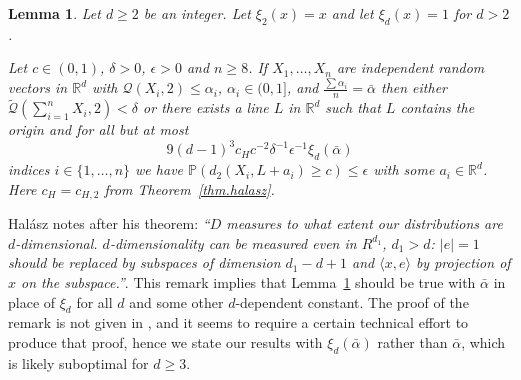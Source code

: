 \documentclass{article}
\newtheorem{lemma} [theorem] {Lemma}\newtheorem{attempt} [theorem] {Attempt}\newtheorem{corollary} [theorem] {Corollary}\newtheorem{prop} [theorem] {Proposition}\newtheorem{definition} [theorem] {Definition}\newtheorem{remark} [theorem] {Remark}\newtheorem{conjecture} [theorem] {Conjecture}\newtheorem{claim} [theorem] {Claim}
\newcommand{\pr}{\mathbb P}
\newcommand{\conc}{\mathcal{Q}}
\newcommand{\concdiam}{\tilde{\mathcal{Q}}}
\begin{document}
\begin{lemma}\label{lem.halasz_corollary2} 
    Let $d \ge 2$ be an integer. Let $\xi_2(x) = x$ and let $\xi_d(x) = 1$ for $d > 2$.
    
    Let $c \in (0,1)$, $\delta > 0$, $\epsilon > 0$ and $n \ge 8$.
    If $X_1, \dots, X_n$ are independent random vectors in $\mathbb{R}^d$ with $\conc(X_i, 2) \le \alpha_i$, $\alpha_i \in (0,1]$, and $\frac {\sum \alpha_i} n = \bar{\alpha}$ then
    either $\concdiam(\sum_{i=1}^n X_i, 2) < \delta$
    or there exists a line $L$ in $\mathbb{R}^d$ such that $L$ contains the origin and for
    all but at most 
    \[
        9 (d-1)^3 c_H c^{-2}  \delta^{-1}  \epsilon^{-1} \xi_d(\bar{\alpha})
    \]
    indices $i \in \{1, \dots, n\}$ we have $\pr(d_2(X_i, L + a_i) \ge c) \le \epsilon$ with some $a_i \in \mathbb{R}^d$. Here $c_H=c_{H,2}$ from Theorem~\ref{thm.halasz}.
\end{lemma}

Hal{\'a}sz \cite{halasz} notes after his theorem: \textit{``$D$ measures to what extent our distributions are $d$-dimensional. $d$-dimensionality can be measured even in $R^{d_1}$, $d_1 > d$: $|e|=1$ should be replaced by subspaces of dimension $d_1 - d+1$ and $\langle x,e\rangle$ by projection of $x$ on the subspace.''}. This remark implies that Lemma~\ref{lem.halasz_corollary2} should be true with $\bar{\alpha}$ in place of $\xi_d$ for all $d$ and some other $d$-dependent constant. The proof of the remark is not given in \cite{halasz}, and it seems to require a certain technical effort to produce that proof, hence we state our results with $\xi_d(\bar\alpha)$ rather than $\bar{\alpha}$, which is likely suboptimal for $d \ge 3$.

\medskip
\end{document}
